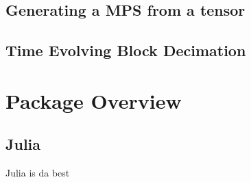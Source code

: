 \documentclass[12pt]{article}
\begin{document}
\begin{multicols}{2}
	\subsection*{Generating a MPS from a tensor}
	\subsection*{Time Evolving Block Decimation}
\section*{Package Overview}
	\subsection*{Julia}
		Julia is da best


\end{multicols}

\end{document}
